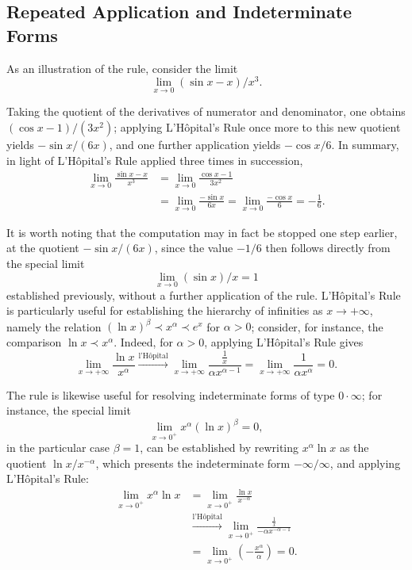 \subsection{Repeated Application and Indeterminate Forms}

As an illustration of the rule, consider the limit
\[
\lim_{x \to 0} (\sin x - x)/x^3.
\]

Taking the quotient of the derivatives of numerator and denominator, one obtains $(\cos x - 1)/(3x^2)$; applying L'H\^opital's Rule once more to this new quotient yields $-\sin x / (6x)$, and one further application yields $-\cos x / 6$. In summary, in light of L'H\^opital's Rule applied three times in succession,
\[
\begin{aligned}
\lim_{x \to 0} \frac{\sin x - x}{x^3}
&= \lim_{x \to 0} \frac{\cos x - 1}{3x^2} \\
&= \lim_{x \to 0} \frac{-\sin x}{6x}
= \lim_{x \to 0} \frac{-\cos x}{6}
= -\frac{1}{6}.
\end{aligned}
\]

It is worth noting that the computation may in fact be stopped one step earlier, at the quotient $-\sin x / (6x)$, since the value $-1/6$ then follows directly from the special limit \[
\lim_{x \to 0} (\sin x)/x = 1
\] established previously, without a further application of the rule. L'H\^opital's Rule is particularly useful for establishing the hierarchy of infinities as $x \to +\infty$, namely the relation $(\ln x)^\beta \prec x^\alpha \prec e^x$ for $\alpha > 0$; consider, for instance, the comparison $\ln x \prec x^\alpha$. Indeed, for $\alpha > 0$, applying L'H\^opital's Rule gives
\[
\lim_{x \to +\infty} \frac{\ln x}{x^\alpha} \xrightarrow{\text{l'H\^opital}} \lim_{x \to +\infty} \frac{\frac{1}{x}}{\alpha x^{\alpha - 1}} = \lim_{x \to +\infty} \frac{1}{\alpha x^\alpha} = 0.
\]

The rule is likewise useful for resolving indeterminate forms of type $0 \cdot \infty$; for instance, the special limit \[
\lim_{x \to 0^+} x^\alpha (\ln x)^\beta = 0,
\] in the particular case $\beta = 1$, can be established by rewriting $x^\alpha \ln x$ as the quotient $\ln x / x^{-\alpha}$, which presents the indeterminate form $-\infty / \infty$, and applying L'H\^opital's Rule:
\[
\begin{aligned}
\lim_{x \to 0^+} x^\alpha \ln x
&= \lim_{x \to 0^+} \frac{\ln x}{x^{-\alpha}} \\
&\xrightarrow{\text{l'H\^opital}} \lim_{x \to 0^+} \frac{\frac{1}{x}}{-\alpha x^{-\alpha - 1}} \\
&= \lim_{x \to 0^+} \left( -\frac{x^\alpha}{\alpha} \right) = 0.
\end{aligned}
\]

